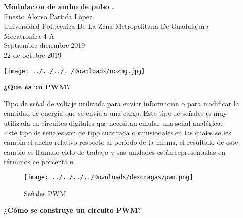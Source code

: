 \documentclass[12pt]{report}
\begin{document}
\begin{center}
{\Huge \textbf{Modulacion de ancho de pulso .}\\}
\Large{Enesto Alonso Partida López\\ Universidad Politecnica De La Zona Metropolitana De Guadalajara\\ Mecatronica 4 A\\ Septiembre-diciembre 2019}\\
{22 de octubre 2019 }\\
\end{center}
\begin{center}


\texttt{[image: ../../../../Downloads/upzmg.jpg]} 
\end{center}
\newpage
{\huge \textbf{¿Que es un PWM?}\\}


{\Large Tipo de señal de voltaje utilizada para enviar información o para modificar la cantidad de energía que se envía a una carga. Este tipo de señales es muy utilizada en circuitos digitales que necesitan emular una señal analógica.\\
Este tipo de señales son de tipo cuadrada o sinusiodales en las cuales se les cambia el ancho relativo respecto al período de la misma, el resultado de este cambio es llamado ciclo de trabajo y sus unidades están representadas en términos de porcentaje. }\\

\begin{center}
\begin{figure}[hbtp]
\centering
\texttt{[image: ../../../../Downloads/descragas/pwm.png]}
\caption{Señales PWM}
\end{figure}

\end{center}
{\huge \textbf{¿Cómo se construye un circuito PWM?  }}\\
\end{document}

